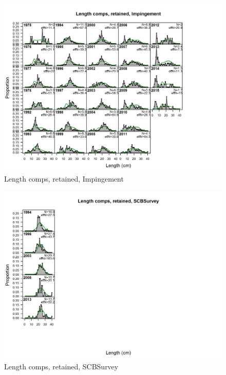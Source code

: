 \documentclass[12pt,]{article}
\begin{document}
\begin{figure}[htbp]
\centering
\includegraphics{./r4ss/plots_mod1/comp_lenfit_flt10mkt2.png}
\caption{Length comps, retained, Impingement
\label{fig:mod1_12_comp_lenfit_flt10mkt2}}
\end{figure}

\begin{figure}[htbp]
\centering
\includegraphics{./r4ss/plots_mod1/comp_lenfit_flt11mkt2.png}
\caption{Length comps, retained, SCBSurvey
\label{fig:mod1_13_comp_lenfit_flt11mkt2}}
\end{figure}

\newpage

\color{black}
\end{document}
